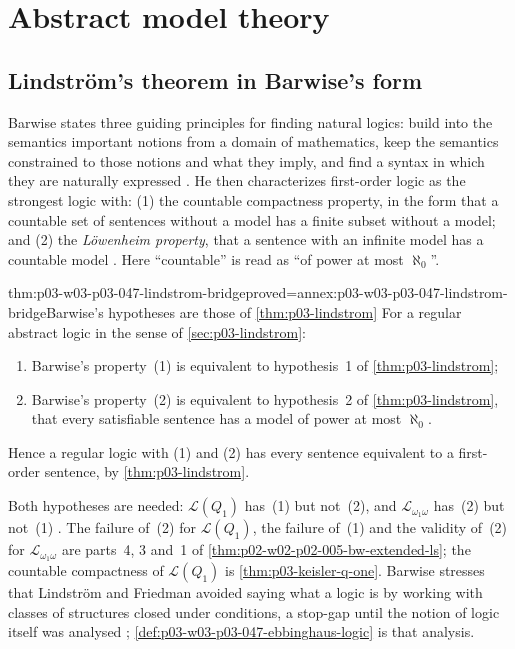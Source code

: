 \section{Abstract model theory}
\label{sec:p03-w03-p03-047-barwise-abstract}

\subsection{Lindstr\"om's theorem in Barwise's form}

Barwise states three guiding principles for finding natural logics: build
into the semantics important notions from a domain of mathematics, keep the
semantics constrained to those notions and what they imply, and find a syntax
in which they are naturally expressed \cite[Ch.~I, \S2.1, p.~14]{Barwise1985BackgroundAims}.
He then characterizes first-order logic as the strongest logic with:
(1) the countable compactness property, in the form that a countable set of
sentences without a model has a finite subset without a model; and (2) the
\emph{L\"owenheim property}, that a sentence with an infinite model has a
countable model \cite[Ch.~I, \S2.1, p.~14]{Barwise1985BackgroundAims}.  Here
``countable'' is read as ``of power at most \(\aleph_0\)''.

\begin{hbtheorem}{thm:p03-w03-p03-047-lindstrom-bridge}{proved=annex:p03-w03-p03-047-lindstrom-bridge}{Barwise's hypotheses are those of \cref{thm:p03-lindstrom}}
For a regular abstract logic in the sense of \cref{sec:p03-lindstrom}:
\begin{enumerate}
 \item Barwise's property~(1) is equivalent to hypothesis~1 of
       \cref{thm:p03-lindstrom};
 \item Barwise's property~(2) is equivalent to hypothesis~2 of
       \cref{thm:p03-lindstrom}, that every satisfiable sentence has a model
       of power at most \(\aleph_0\).
\end{enumerate}
Hence a regular logic with (1) and (2) has every sentence equivalent to a
first-order sentence, by \cref{thm:p03-lindstrom}.
\end{hbtheorem}

Both hypotheses are needed: \(\mathscr L(Q_1)\) has~(1) but not~(2), and
\(\mathscr L_{\omega_1\omega}\) has~(2) but not~(1)
\cite[Ch.~I, \S2.1, p.~14]{Barwise1985BackgroundAims}.  The failure of~(2) for
\(\mathscr L(Q_1)\), the failure of~(1) and the validity of~(2) for
\(\mathscr L_{\omega_1\omega}\) are parts~4, 3 and~1 of
\cref{thm:p02-w02-p02-005-bw-extended-ls}; the countable compactness of
\(\mathscr L(Q_1)\) is \cref{thm:p03-keisler-q-one}.  Barwise stresses that Lindstr\"om and
Friedman avoided saying what a logic is by working with classes of
structures closed under conditions, a stop-gap until the notion of logic
itself was analysed \cite[Ch.~I, \S2.1, pp.~14--15]{Barwise1985BackgroundAims};
\cref{def:p03-w03-p03-047-ebbinghaus-logic} is that analysis.

